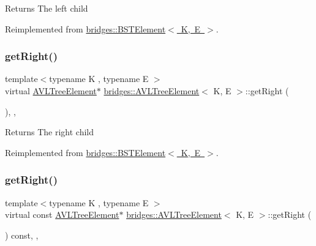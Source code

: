 \begin{DoxyReturn}{Returns}
The left child 
\end{DoxyReturn}


Reimplemented from \mbox{\hyperlink{classbridges_1_1_b_s_t_element_a2abcfb991f6cc377da2bd9217319fc9c}{bridges\+::\+B\+S\+T\+Element$<$ K, E $>$}}.

\mbox{\label{classbridges_1_1_a_v_l_tree_element_a909b46ebf3e8c6a3434762a1f01499e2}} 
\subsubsection{\texorpdfstring{get\+Right()}{getRight()}\hspace{0.1cm}{\footnotesize\ttfamily [1/2]}}
{\footnotesize\ttfamily template$<$typename K , typename E $>$ \\
virtual \mbox{\hyperlink{classbridges_1_1_a_v_l_tree_element}{A\+V\+L\+Tree\+Element}}$\ast$ \mbox{\hyperlink{classbridges_1_1_a_v_l_tree_element}{bridges\+::\+A\+V\+L\+Tree\+Element}}$<$ K, E $>$\+::get\+Right (\begin{DoxyParamCaption}{ }\end{DoxyParamCaption})\hspace{0.3cm}{\ttfamily [inline]}, {\ttfamily [override]}, {\ttfamily [virtual]}}

\begin{DoxyReturn}{Returns}
The right child 
\end{DoxyReturn}


Reimplemented from \mbox{\hyperlink{classbridges_1_1_b_s_t_element_a35e93bce32de933522dccde5f2b5ffd9}{bridges\+::\+B\+S\+T\+Element$<$ K, E $>$}}.

\mbox{\label{classbridges_1_1_a_v_l_tree_element_a2f6fd127f3a04fcc5be60299b7d98f12}} 
\subsubsection{\texorpdfstring{get\+Right()}{getRight()}\hspace{0.1cm}{\footnotesize\ttfamily [2/2]}}
{\footnotesize\ttfamily template$<$typename K , typename E $>$ \\
virtual const \mbox{\hyperlink{classbridges_1_1_a_v_l_tree_element}{A\+V\+L\+Tree\+Element}}$\ast$ \mbox{\hyperlink{classbridges_1_1_a_v_l_tree_element}{bridges\+::\+A\+V\+L\+Tree\+Element}}$<$ K, E $>$\+::get\+Right (\begin{DoxyParamCaption}{ }\end{DoxyParamCaption}) const\hspace{0.3cm}{\ttfamily [inline]}, {\ttfamily [override]}, {\ttfamily [virtual]}}

